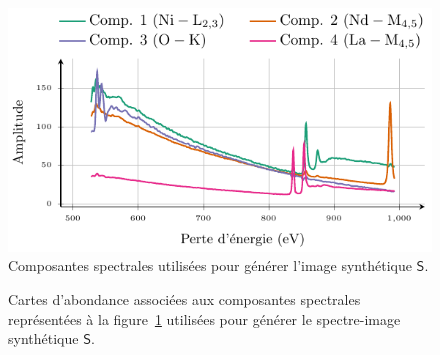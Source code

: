 \begin{figure}[b]
    \centering
    \includegraphics{img/chapitre4/figure16/synth_spectra.pdf}
    \caption{Composantes spectrales utilisées pour générer l'image synthétique $\mathsf{S}$.
        \protect\label{fig-spectra-synth}}
\end{figure}

\begin{figure}[t]
    \centering
    \setlength\tmplength{5cm}
    \caption{Cartes d'abondance associées aux composantes spectrales représentées à la figure~\protect\ref{fig-spectra-synth} utilisées pour générer le spectre-image synthétique $\mathsf{S}$.
        \protect\label{fig-maps-synth}}
\end{figure}


